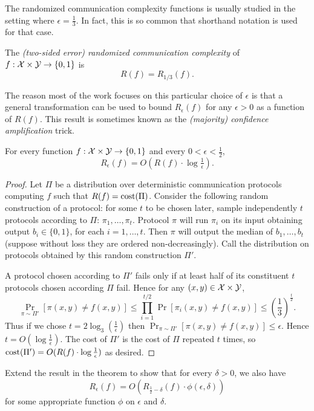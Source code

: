 The randomized communication complexity functions is usually studied in the setting where $\epsilon = \frac13$. In fact, this is so common that shorthand notation is used for that case.

\begin{definition}
The \emph{(two-sided error) randomized communication complexity} of $f : \mathcal{X} \times \mathcal{Y} \to \{0,1\}$ is
\[
R(f) = R_{1/3}(f).
\]
\end{definition}

The reason most of the work focuses on this particular choice of $\epsilon$ is that a general transformation can be used to bound $R_\epsilon(f)$ for any $\epsilon > 0$ as a function of $R(f)$. This result is sometimes known as the \emph{(majority) confidence amplification} trick.

\begin{theorem}
For every function $f : \mathcal{X} \times \mathcal{Y} \to \{0,1\}$ and every $0 < \epsilon < \frac12$, 
\[
R_\epsilon(f) = O\left( R(f) \cdot \log \tfrac1\epsilon \right).
\]
\end{theorem}

\begin{proof}
Let $\Pi$ be a distribution over deterministic communication protocols computing $f$ such that $R(f) = \mathrm{cost}(\Pi)$. Consider the following random construction of a protocol: for some $t$ to be chosen later, sample independently $t$ protocols according to $\Pi$: $\pi_1,\dots, \pi_t$. Protocol $\pi$ will run $\pi_i$ on its input obtaining output $b_i \in\{0,1\}$, for each $i = 1,\dots, t$. Then $\pi$ will output the median of $b_1, \dots, b_t$ (suppose without loss they are ordered non-decreasingly). Call the distribution on protocols obtained by this random construction $\Pi'$.

A protocol chosen according to $\Pi'$ fails only if at least half of its constituent $t$ protocols chosen according $\Pi$ fail. Hence for any $(x,y) \in \mathcal{X}\times \mathcal{Y}$,
$$\Pr_{\pi \sim \Pi'}[\pi(x,y)\neq f(x,y)] \leq \prod_{i=1}^{t/2} \Pr[\pi_i(x,y) \neq f(x,y)] \leq (\frac{1}{3})^{\frac{t}{2}}.$$
Thus if we chose $t = 2\log_3(\frac{1}{\epsilon})$ then $\Pr_{\pi \sim \Pi'}[\pi(x,y)\neq f(x,y)] \leq \epsilon$. Hence $t = O(\log\frac{1}{\epsilon})$. The cost of $\Pi'$ is the cost of $\Pi$ repeated $t$ times, so $\mathrm{cost}(\Pi') = O(R(f)\cdot \log\frac{1}{\epsilon})$ as desired.
\end{proof}

\exercises

\begin{exercise}
Extend the result in the theorem to show that for every $\delta > 0$, we also have
\[
R_\epsilon(f) = O\left( R_{\frac12 - \delta}(f) \cdot \phi(\epsilon,\delta) \right)
\]
for some appropriate function $\phi$ on $\epsilon$ and $\delta$.
\end{exercise}


